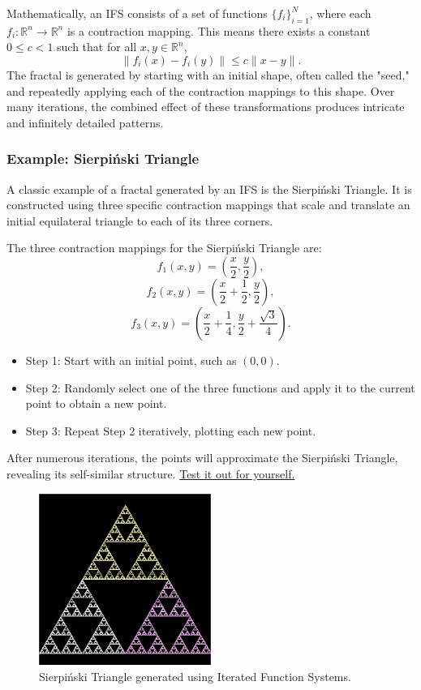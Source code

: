 \documentclass[12pt]{article}
\begin{document}
Mathematically, an IFS consists of a set of functions \( \{f_i\}_{i=1}^N \), where each \( f_i: \mathbb{R}^n \to \mathbb{R}^n \) is a contraction mapping. This means there exists a constant \( 0 \leq c < 1 \) such that for all \( x, y \in \mathbb{R}^n \),
\[
\| f_i(x) - f_i(y) \| \leq c \| x - y \|.
\]
The fractal is generated by starting with an initial shape, often called the "seed," and repeatedly applying each of the contraction mappings to this shape. Over many iterations, the combined effect of these transformations produces intricate and infinitely detailed patterns.

\subsubsection{Example: Sierpiński Triangle}
A classic example of a fractal generated by an IFS is the Sierpiński Triangle. It is constructed using three specific contraction mappings that scale and translate an initial equilateral triangle to each of its three corners.

The three contraction mappings for the Sierpiński Triangle are:
\[
f_1(x, y) = \left( \frac{x}{2}, \frac{y}{2} \right),
\]
\[
f_2(x, y) = \left( \frac{x}{2} + \frac{1}{2}, \frac{y}{2} \right),
\]
\[
f_3(x, y) = \left( \frac{x}{2} + \frac{1}{4}, \frac{y}{2} + \frac{\sqrt{3}}{4} \right).
\]

\begin{itemize}
    \item Step 1: Start with an initial point, such as \( (0,0) \).
    \item Step 2: Randomly select one of the three functions and apply it to the current point to obtain a new point.
    \item Step 3: Repeat Step 2 iteratively, plotting each new point.
\end{itemize}

After numerous iterations, the points will approximate the Sierpiński Triangle, revealing its self-similar structure. \href{https://cs.lmu.edu/~ray/notes/ifs/}{Test it out for yourself.}

\begin{figure}[h]
\centering
\includegraphics[width=0.5\textwidth]{assets/sierpinski-triangle.png}
\caption{Sierpiński Triangle generated using Iterated Function Systems.}
\label{fig:sierpinski}
\end{figure}
\end{document}
